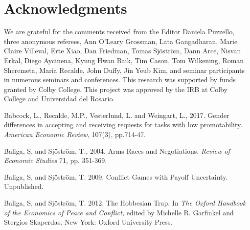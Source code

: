 \documentclass[12pt, letterpaper]{article}
\theoremstyle{plain}
\begin{document}
\section{Acknowledgments}
We are grateful for the comments received from the Editor Daniela Puzzello, three anonymous referees, Ann O'Leary Grossman, Lata Gangadharan, Marie Claire Villeval, Erte Xiao, Dan Friedman, Tomas Sj\"ostr\"om, Dann Arce, Nisvan Erkal, Diego Aycinena, Kyung Hwan Baik, Tim Cason, Tom Wilkening, Roman Sheremeta, Maria Recalde, John Duffy, Jin Yeub Kim, and seminar participants in numerous seminars and conferences. This research was supported by funds granted by Colby College. This project was approved by the IRB at Colby College and Universidad del Rosario.

\newpage
\begin{thebibliography}{10}




\bibitem{} Babcock, L., Recalde, M.P., Vesterlund, L. and Weingart, L., 2017. Gender differences in accepting and receiving requests for tasks with low promotability. \textit{American Economic Review,} 107(3), pp.714-47.


  Baliga, S. and Sj\"ostr\"om, T., 2004. Arms Races and Negotiations. \textit{Review of Economic Studies} 71, pp. 351-369.

\bibitem{} Baliga, S, and Sj\"ostr\"om, T. 2009. Conflict Games with Payoff Uncertainty. Unpublished.

\bibitem{} Baliga, S, and Sj\"ostr\"om, T. 2012. The Hobbesian Trap. In \textit{The Oxford Handbook of the Economics of Peace and Conflict,} edited by Michelle R. Garfinkel and Stergios Skaperdas. New York: Oxford University Press.



\end{thebibliography}
\end{document}
